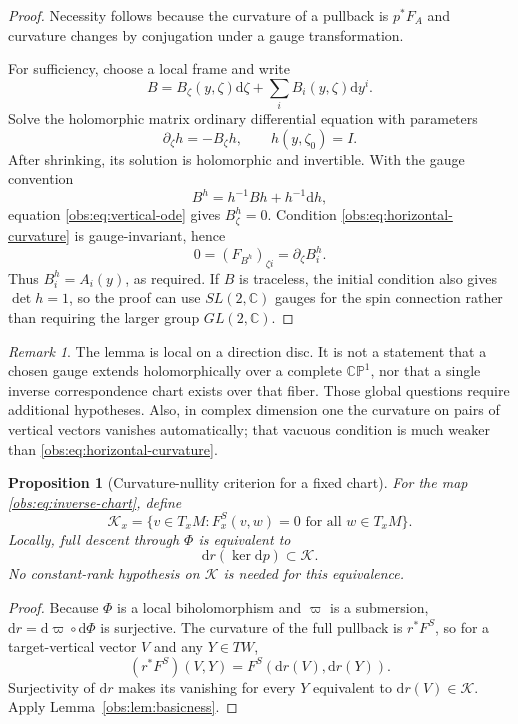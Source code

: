 \documentclass[11pt]{article}
\newtheorem{proposition}[theorem]{Proposition}
\theoremstyle{definition}
\theoremstyle{remark}
\newtheorem{remark}[theorem]{Remark}
\newcommand{\CP}{\mathbb{CP}}
\newcommand{\C}{\mathbb C}
\newcommand{\dd}{\mathrm d}
\begin{document}
\begin{proof}
Necessity follows because the curvature of a pullback is $p^*F_A$ and
curvature changes by conjugation under a gauge transformation.

For sufficiency, choose a local frame and write
\[
 B=B_\zeta(y,\zeta)\dd\zeta+\sum_i B_i(y,\zeta)\dd y^i.
\]
Solve the holomorphic matrix ordinary differential equation with parameters
\begin{equation}\label{obs:eq:vertical-ode}
 \partial_\zeta h=-B_\zeta h,
 \qquad h(y,\zeta_0)=I.
\end{equation}
After shrinking, its solution is holomorphic and invertible. With the gauge
convention
\[
 B^h=h^{-1}Bh+h^{-1}\dd h,
\]
equation \eqref{obs:eq:vertical-ode} gives $B^h_\zeta=0$.
Condition \eqref{obs:eq:horizontal-curvature} is gauge-invariant, hence
\[
 0=(F_{B^h})_{\zeta i}=\partial_\zeta B^h_i.
\]
Thus $B^h_i=A_i(y)$, as required. If $B$ is traceless, the initial condition
also gives $\det h=1$, so the proof can use $SL(2,\C)$ gauges for the spin
connection rather than requiring the larger group $GL(2,\C)$.
\end{proof}

\begin{remark}
The lemma is local on a direction disc. It is not a statement that a chosen
gauge extends holomorphically over a complete $\CP^1$, nor that a single
inverse correspondence chart exists over that fiber. Those global
questions require additional hypotheses. Also, in complex dimension one
the curvature on pairs of vertical vectors vanishes automatically; that
vacuous condition is much weaker than \eqref{obs:eq:horizontal-curvature}.
\end{remark}

\begin{proposition}[Curvature-nullity criterion for a fixed chart]
\label{obs:prop:fixed-chart}
For the map \eqref{obs:eq:inverse-chart}, define
\begin{equation}\label{obs:eq:nullity}
 \mathcal K_x=\{v\in T_xM:F^S_x(v,w)=0\text{ for all }w\in T_xM\}.
\end{equation}
Locally, full descent through $\Phi$ is equivalent to
\begin{equation}\label{obs:eq:vertical-nullity}
 \dd r(\ker\dd p)\subset\mathcal K.
\end{equation}
No constant-rank hypothesis on $\mathcal K$ is needed for this equivalence.
\end{proposition}

\begin{proof}
Because $\Phi$ is a local biholomorphism and $\varpi$ is a submersion,
$\dd r=\dd\varpi\circ\dd\Phi$ is surjective. The curvature of the full
pullback is $r^*F^S$, so for a target-vertical vector $V$ and any $Y\in TW$,
\[
 (r^*F^S)(V,Y)=F^S(\dd r(V),\dd r(Y)).
\]
Surjectivity of $\dd r$ makes its vanishing for every $Y$ equivalent to
$\dd r(V)\in\mathcal K$. Apply Lemma~\ref{obs:lem:basicness}.
\end{proof}
\end{document}
